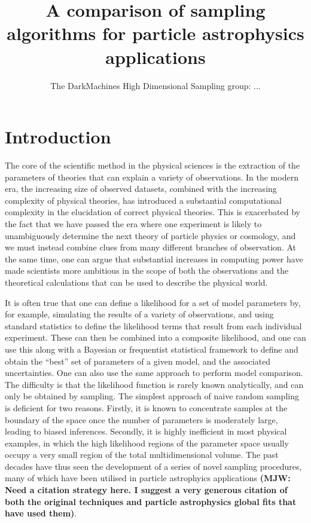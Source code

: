 \documentclass[11pt]{article}
\title{A comparison of sampling algorithms for particle astrophysics applications}
\author{The DarkMachines High Dimensional Sampling group: ...}
\begin{document}
\section{Introduction}
\maketitle

The core of the scientific method in the physical sciences is the extraction of the parameters of theories that can explain a variety of observations. In the modern era, the increasing size of observed datasets, combined with the increasing complexity of physical theories, has introduced a substantial computational complexity in the elucidation of correct physical theories. This is exacerbated by the fact that we have passed the era where one experiment is likely to unambiguously determine the next theory of particle physics or cosmology, and we must instead combine clues from many different branches of observation. At the same time, one can argue that substantial increases in computing power have made scientists more ambitious in the scope of both the observations and the theoretical calculations that can be used to describe the physical world.

It is often true that one can define a likelihood for a set of model parameters by, for example, simulating the results of a variety of observations, and using standard statistics to define the likelihood terms that result from each individual experiment. These can then be combined into a composite likelihood, and one can use this along with a Bayesian or frequentist statistical framework to define and obtain the ``best'' set of parameters of a given model, and the associated uncertainties. One can also use the same approach to perform model comparison. The difficulty is that the likelihood function is rarely known analytically, and can only be obtained by sampling. The simplest approach of naive random sampling is deficient for two reasons. Firstly, it is known to concentrate samples at the boundary of the space once the number of parameters is moderately large, leading to biased inferences. Secondly, it is highly inefficient in most physical examples, in which the high likelihood regions of the parameter space usually occupy a very small region of the total multidimensional volume. The past decades have thus seen the development of a series of novel sampling procedures, many of which have been utilised in particle astrophyics applications {\bf (MJW: Need a citation strategy here. I suggest a very generous citation of both the original techniques and particle astrophysics global fits that have used them)}. 
\end{document}
